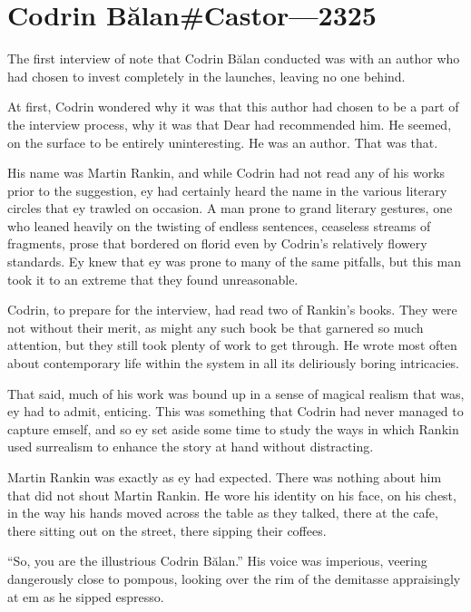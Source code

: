\hypertarget{codrin-bux103lancastor-2325}{%
\chapter{Codrin Bălan\#Castor—2325}\label{codrin-bux103lancastor-2325}}

The first interview of note that Codrin Bălan conducted was with an author who had chosen to invest completely in the launches, leaving no one behind.

At first, Codrin wondered why it was that this author had chosen to be a part of the interview process, why it was that Dear had recommended him. He seemed, on the surface to be entirely uninteresting. He was an author. That was that.

His name was Martin Rankin, and while Codrin had not read any of his works prior to the suggestion, ey had certainly heard the name in the various literary circles that ey trawled on occasion. A man prone to grand literary gestures, one who leaned heavily on the twisting of endless sentences, ceaseless streams of fragments, prose that bordered on florid even by Codrin's relatively flowery standards. Ey knew that ey was prone to many of the same pitfalls, but this man took it to an extreme that they found unreasonable.

Codrin, to prepare for the interview, had read two of Rankin's books. They were not without their merit, as might any such book be that garnered so much attention, but they still took plenty of work to get through. He wrote most often about contemporary life within the system in all its deliriously boring intricacies.

That said, much of his work was bound up in a sense of magical realism that was, ey had to admit, enticing. This was something that Codrin had never managed to capture emself, and so ey set aside some time to study the ways in which Rankin used surrealism to enhance the story at hand without distracting.

Martin Rankin was exactly as ey had expected. There was nothing about him that did not shout Martin Rankin. He wore his identity on his face, on his chest, in the way his hands moved across the table as they talked, there at the cafe, there sitting out on the street, there sipping their coffees.

``So, you are the illustrious Codrin Bălan.'' His voice was imperious, veering dangerously close to pompous, looking over the rim of the demitasse appraisingly at em as he sipped espresso.

